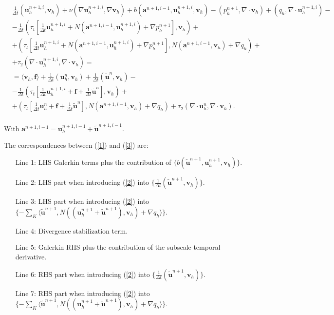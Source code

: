\begin{footnotesize}
\begin{align}
\label{3}
&\frac{1}{\Delta t}(\mathbf{u}_h^{n+1,i},\mathbf{v}_h)+\nu(\nabla\mathbf{u}_h^{n+1,i},\nabla\mathbf{v}_h)+b(\mathbf{a}^{n+1,i-1},\mathbf{u}_h^{n+1,i},\mathbf{v}_h)-(p_h^{n+1},\nabla\cdot\mathbf{v}_h)+(q_h,\nabla\cdot\mathbf{u}_h^{n+1,i})-\\\nonumber
&-\frac{1}{\Delta t}\left(\tau_t\left[\frac{1}{\Delta t}\mathbf{u}_h^{n+1,i}+N(\mathbf{a}^{n+1,i-1},\mathbf{u}_h^{n+1,i})+\nabla p_h^{n+1}\right],\mathbf{v}_h\right)+\\\nonumber
&+\left(\tau_t\left[\frac{1}{\Delta t}\mathbf{u}_h^{n+1,i}+N(\mathbf{a}^{n+1,i-1},\mathbf{u}_h^{n+1,i})+\nabla p_h^{n+1}\right],N(\mathbf{a}^{n+1,i-1},\mathbf{v}_h)+\nabla q_h\right)+\\\nonumber
&+\tau_2(\nabla\cdot\mathbf{u}_h^{n+1,i},\nabla\cdot\mathbf{v}_h)=\\\nonumber
&=\langle\mathbf{v}_h,\mathbf{f}\rangle+\frac{1}{\Delta t}(\mathbf{u}_h^{n},\mathbf{v}_h)+\frac{1}{\Delta t}(\tilde{\mathbf{u}}^{n},\mathbf{v}_h)-\\\nonumber
&-\frac{1}{\Delta t}\left(\tau_t\left[\frac{1}{\Delta t}\mathbf{u}_h^{n+1,i}+\mathbf{f}+\frac{1}{\Delta t}\tilde{\mathbf{u}}^n\right],\mathbf{v}_h\right)+\\\nonumber
& +\left(\tau_t\left[\frac{1}{\Delta t}\mathbf{u}_h^{n}+\mathbf{f}+\frac{1}{\Delta t}\tilde{\mathbf{u}}^n\right],N(\mathbf{a}^{n+1,i-1},\mathbf{v}_h)+\nabla q_h\right)+\tau_2(\nabla\cdot\mathbf{u}_h^{n},\nabla\cdot\mathbf{v}_h).\\\nonumber
\end{align}
\end{footnotesize}

With $\mathbf{a}^{n+1,i-1}=\mathbf{u}_h^{n+1,i-1}+\tilde{\mathbf{u}}^{n+1,i-1}$.

The correspondences between (\ref{1}) and (\ref{3}) are:
\begin{itemize}
\item[Line 1:] LHS Galerkin terms plus the contribution of $\lbrace b(\tilde{\mathbf{u}}^{n+1},\mathbf{u}_h^{n+1},\mathbf{v}_h)\rbrace$.
\item[Line 2:] LHS part when introducing (\ref{2}) into $\lbrace\frac{1}{\Delta t}(\tilde{\mathbf{u}}^{n+1},\mathbf{v}_h)\rbrace$.
\item[Line 3:] LHS part when introducing (\ref{2}) into $\lbrace-\sum_K\langle\tilde{\mathbf{u}}^{n+1},N((\mathbf{u}_h^{n+1}+\tilde{\mathbf{u}}^{n+1}),\mathbf{v}_h)+\nabla q_h\rangle\rbrace$.
\item[Line 4:] Divergence stabilization term.
\item[Line 5:] Galerkin RHS plus the contribution of the subscale temporal derivative.
\item[Line 6:] RHS part when introducing (\ref{2}) into $\lbrace\frac{1}{\Delta t}(\tilde{\mathbf{u}}^{n+1},\mathbf{v}_h)\rbrace$.
\item[Line 7:] RHS part when introducing (\ref{2}) into $\lbrace-\sum_K\langle\tilde{\mathbf{u}}^{n+1},N((\mathbf{u}_h^{n+1}+\tilde{\mathbf{u}}^{n+1}),\mathbf{v}_h)+\nabla q_h\rangle\rbrace$.
\end{itemize}


